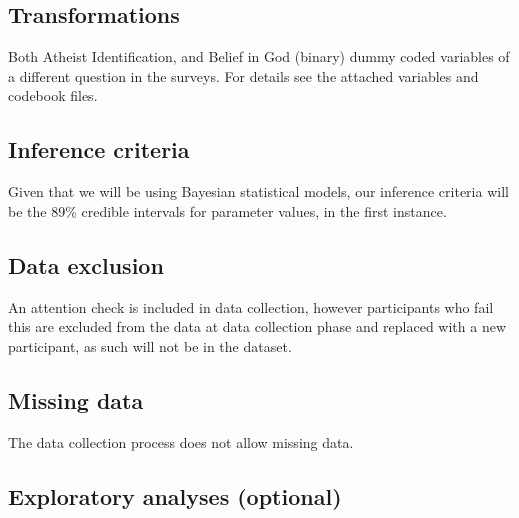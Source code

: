 \documentclass[]{article}
\newcounter{question}
\begin{document}
\hypertarget{transformations}{%
\subsection{Transformations}\label{transformations}}

Both Atheist Identification, and Belief in God (binary) dummy coded
variables of a different question in the surveys. For details see the
attached variables and codebook files.

\hypertarget{inference-criteria}{%
\subsection{Inference criteria}\label{inference-criteria}}

Given that we will be using Bayesian statistical models, our inference
criteria will be the 89\% credible intervals for parameter values, in
the first instance.

\hypertarget{data-exclusion}{%
\subsection{Data exclusion}\label{data-exclusion}}

An attention check is included in data collection, however participants
who fail this are excluded from the data at data collection phase and
replaced with a new participant, as such will not be in the dataset.

\hypertarget{missing-data}{%
\subsection{Missing data}\label{missing-data}}

The data collection process does not allow missing data.

\hypertarget{exploratory-analyses-optional}{%
\subsection{Exploratory analyses
(optional)}\label{exploratory-analyses-optional}}
\end{document}
